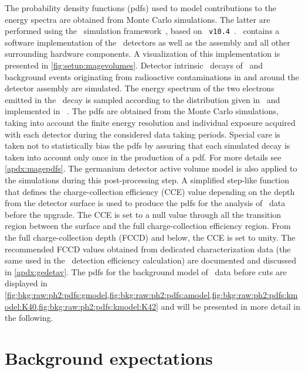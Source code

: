 The probability density functions (pdfs) used to model contributions to the energy spectra
are obtained from Monte Carlo simulations. The latter are performed using the \mage\
simulation framework~\cite{Boswell2011}, based on
\geant~\texttt{v10.4}~\cite{Agostinelli2002, Allison2006, Allison2016}.  \mage\ contains a
software implementation of the \gerdatwo\ detectors as well as the assembly and all other
surrounding hardware components. A visualization of this implementation is presented in
\cref{fig:setup:magevolumes}. Detector intrinsic \nnbb\ decays of \gesix\ and background
events originating from radioactive contaminations in and around the detector assembly are
simulated. The energy spectrum of the two electrons emitted in the \nnbb\ decay is
sampled according to the distribution given in~\cite{Tretyak1995} and implemented in
\decayzero~\cite{Ponkratenko2000}. The pdfs are obtained from the Monte Carlo simulations,
taking into account the finite energy resolution and individual exposure acquired with
each detector during the considered data taking periods. Special care is taken not to
statistically bias the pdfs by assuring that each simulated decay is taken into account
only once in the production of a pdf. For more details see \cref{apdx:magepdfs}. The
germanium detector active volume model is also applied to the simulations during this
post-processing step. A simplified step-like function that defines the charge-collection
efficiency (CCE) value depending on the depth from the detector surface is used to produce
the pdfs for the analysis of \phasetwo\ data before the upgrade. The CCE is set to a null
value through all the transition region between the surface and the full charge-collection
efficiency region. From the full charge-collection depth (FCCD) and below, the CCE is set
to unity. The recommended FCCD values obtained from dedicated characterization data
(the same used in the \onbb\ detection efficiency calculation) are documented and
discussed in \cref{apdx:gedetav}. The pdfs for the background model of \gerdatwo\ data
before cuts are displayed in
\cref{fig:bkg:raw:ph2:pdfs:gmodel,fig:bkg:raw:ph2:pdfs:amodel,fig:bkg:raw:ph2:pdfs:kmodel:K40,fig:bkg:raw:ph2:pdfs:kmodel:K42}
and will be presented in more detail in the following.

\section{Background expectations}%
\label{sec:bkg:raw:ph2:priors}

